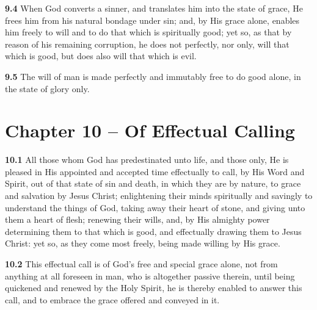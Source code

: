 \par\textbf{9.4} When God converts a sinner, and translates him into the state of grace, He frees him from his natural bondage under sin; and, by His grace alone, enables him freely to will and to do that which is spiritually good; yet so, as that by reason of his remaining corruption, he does not perfectly, nor only, will that which is good, but does also will that which is evil.    

\par\textbf{9.5} The will of man is made perfectly and immutably free to do good alone, in the state of glory only.  

\section{Chapter 10 -- Of Effectual Calling}

\par\textbf{10.1} All those whom God has predestinated unto life, and those only, He is pleased in His appointed and accepted time effectually to call, by His Word and Spirit, out of that state of sin and death, in which they are by nature, to grace and salvation by Jesus Christ; enlightening their minds spiritually and savingly to understand the things of God, taking away their heart of stone, and giving unto them a heart of flesh; renewing their wills, and, by His almighty power determining them to that which is good, and effectually drawing them to Jesus Christ: yet so, as they come most freely, being made willing by His grace.   

\par\textbf{10.2} This effectual call is of God's free and special grace alone, not from anything at all foreseen in man, who is altogether passive therein, until being quickened and renewed by the Holy Spirit, he is thereby enabled to answer this call, and to embrace the grace offered and conveyed in it.   

